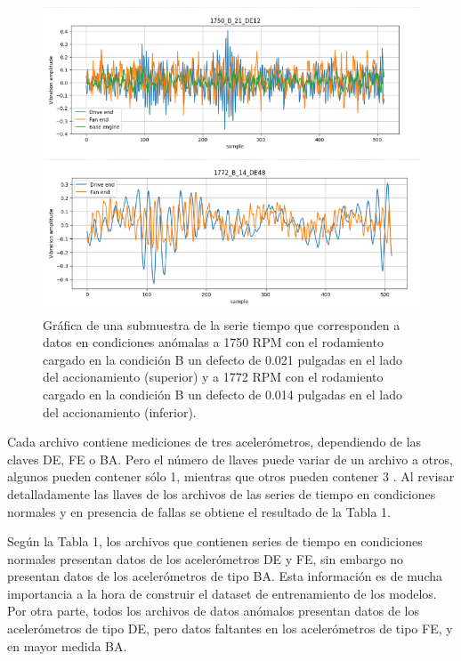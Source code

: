 \documentclass[11pt,a4paper,spanish]{book}
\numberwithin{equation}{chapter}
\numberwithin{figure}{chapter}
\begin{document}
\begin{figure}[h]
    \centering
    \includegraphics[width=1\textwidth]{media/dataset/anomaly-series.png}
    \caption{Gráfica de una submuestra de la serie tiempo que corresponden a datos en condiciones anómalas a 1750 RPM con el rodamiento cargado en la condición B un defecto de 0.021 pulgadas en el lado del accionamiento (superior) y a 1772 RPM con el rodamiento cargado en la condición B un defecto de 0.014 pulgadas en el lado del accionamiento (inferior). }
    \label{fig:figAnomalySeries}
\end{figure}




Cada archivo contiene mediciones de tres acelerómetros, dependiendo de las claves DE, FE o BA. Pero el número de llaves puede variar de un archivo a otros, algunos pueden contener sólo 1, mientras que otros pueden contener 3 \cite{rigas2024marine}. Al revisar detalladamente las llaves de los archivos de las series de tiempo en condiciones normales y en presencia de fallas  se obtiene el resultado de la Tabla 1. 


Según la Tabla 1, los archivos que contienen series de tiempo en condiciones normales presentan datos de los acelerómetros DE y FE, sin embargo no presentan datos de los acelerómetros de tipo BA. Esta información es de mucha importancia a la hora de construir el dataset de entrenamiento de los modelos. Por otra parte, todos los archivos de datos anómalos presentan datos de los acelerómetros de tipo DE, pero datos faltantes en los acelerómetros de tipo FE, y en mayor medida BA. 
\end{document}
